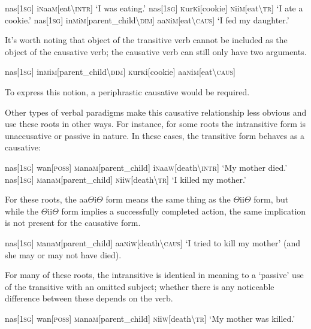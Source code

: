 \documentclass[a4paper,10pt,twoside,openright]{memoir}
\newcommand{\rootpart}{$\Theta$}
\newcommand{\famword}[5]{#1\textsc{#2}#3\textsc{#4}#5}
\begin{document}
\pex
\a
\begingl
nas[\textsc{1sg}]
\famword{i}{n}{aa}{m}{}[eat\textbackslash\textsc{intr}]
\glft `I was eating.'
\endgl
\a
\begingl
nas[\textsc{1sg}]
\famword{}{k}{ur}{k}{i}[cookie]
\famword{}{n}{ii}{m}{}[eat\textbackslash\textsc{tr}]
\glft `I ate a cookie.'
\endgl
\a
\begingl
nas[\textsc{1sg}]
\famword{in}{m}{i}{m}{}[parent\_child\textbackslash\textsc{dim}]
\famword{aa}{n}{i}{m}{}[eat\textbackslash\textsc{caus}]
\glft `I fed my daughter.'
\endgl
\xe

It's worth noting that object of the transitive verb cannot be included as the object of the causative verb; the causative verb can still only have two arguments.

\ex
\ljudge{*}
\begingl
nas[\textsc{1sg}]
\famword{in}{m}{i}{m}{}[parent\_child\textbackslash\textsc{dim}]
\famword{}{k}{ur}{k}{i}[cookie]
\famword{aa}{n}{i}{m}{}[eat\textbackslash\textsc{caus}]
\endgl
\xe

\noindent To express this notion, a periphrastic causative would be required.

Other types of verbal paradigms make this causative relationship less obvious and use these roots in other ways. For instance, for some roots the intransitive form is unaccusative or passive in nature. In these cases, the transitive form behaves as a causative:

\pex
\a
\begingl
nas[\textsc{1sg}]
wan[\textsc{poss}]
\famword{}{m}{ana}{m}{}[parent\_child]
\famword{i}{n}{aa}{w}{}[death\textbackslash\textsc{intr}]
\glft `My mother died.'
\endgl
\a
\begingl
nas[\textsc{1sg}]
\famword{}{m}{ana}{m}{}[parent\_child]
\famword{}{n}{ii}{w}{}[death\textbackslash\textsc{tr}]
\glft `I killed my mother.'
\endgl
\xe

For these roots, the aa{\rootpart}i{\rootpart} form means the same thing as the {\rootpart}ii{\rootpart} form, but while the {\rootpart}ii{\rootpart} form implies a successfully completed action, the same implication is not present for the causative form.

\ex
\begingl
nas[\textsc{1sg}]
\famword{}{m}{ana}{m}{}[parent\_child]
\famword{aa}{n}{i}{w}{}[death\textbackslash\textsc{caus}]
\glft `I tried to kill my mother' (and she may or may not have died).
\endgl
\xe

\noindent For many of these roots, the intransitive is identical in meaning to a `passive' use of the transitive with an omitted subject; whether there is any noticeable difference between these depends on the verb.

\ex
\begingl
nas[\textsc{1sg}]
wan[\textsc{poss}]
\famword{}{m}{ana}{m}{}[parent\_child]
\famword{}{n}{ii}{w}{}[death\textbackslash\textsc{tr}]
\glft `My mother was killed.'
\endgl
\xe
\end{document}

